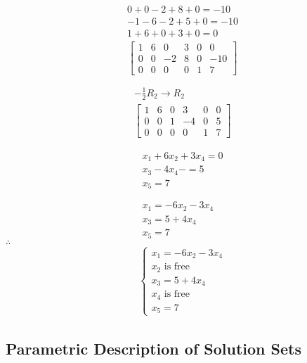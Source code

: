 \documentclass[12pt letter]{report}
\begin{document}
{{    \begin{align*}
      \begin{split}
        0 + 0 -2 + 8 + 0 = -10 \\
        -1 -6 -2 + 5 + 0 = -10 \\
        \hline
        1 + 6 + 0 + 3 + 0 = 0
      \end{split}
    \end{align*}
    \[
      \begin{bmatrix}
        1 & 6 & 0  & 3 & 0 & 0   \\
        0 & 0 & -2 & 8 & 0 & -10 \\
        0 & 0 & 0  & 0 & 1 & 7
      \end{bmatrix}
    \]

    \begin{align*}
      -\frac{1}{2}R_2 \to R_2 \\
      \begin{bmatrix}
        1 & 6 & 0 & 3  & 0 & 0 \\
        0 & 0 & 1 & -4 & 0 & 5 \\
        0 & 0 & 0 & 0  & 1 & 7
      \end{bmatrix}
    \end{align*}

    \begin{align*}
      x_1 + 6x_2  +3x_4 = 0 \\
      x_3 - 4x_4 -  = 5     \\
      x_5 = 7               \\
      \\
      \\
      x_1 = -6x_2 - 3x_4    \\
      x_3 =  5 + 4x_4       \\
      x_5 = 7
    \end{align*}
    $\therefore$
    \begin{align*}
      \begin{cases}
        x_1 = -6x_2 - 3x_4   \\
        x_2 \text{ is free } \\
        x_3 =  5 + 4x_4      \\
        x_4 \text{ is free}  \\
        x_5 = 7
      \end{cases}
    \end{align*}
  }
}

\subsection{Parametric Description of Solution Sets}
\end{document}
